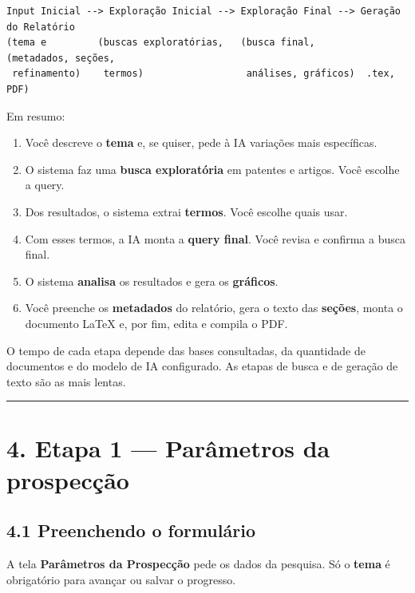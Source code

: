 \documentclass[
  brazilian,
  a4paper,12pt,oneside]{report}
\providecommand{\tightlist}{%
  \setlength{\itemsep}{0pt}\setlength{\parskip}{0pt}}
\begin{document}
\begin{verbatim}
Input Inicial --> Exploração Inicial --> Exploração Final --> Geração do Relatório
(tema e         (buscas exploratórias,   (busca final,        (metadados, seções,
 refinamento)    termos)                  análises, gráficos)  .tex, PDF)
\end{verbatim}

Em resumo:

\begin{enumerate}
\def\labelenumi{\arabic{enumi}.}
\tightlist
\item
  Você descreve o \textbf{tema} e, se quiser, pede à IA variações mais
  específicas.
\item
  O sistema faz uma \textbf{busca exploratória} em patentes e artigos.
  Você escolhe a query.
\item
  Dos resultados, o sistema extrai \textbf{termos}. Você escolhe quais
  usar.
\item
  Com esses termos, a IA monta a \textbf{query final}. Você revisa e
  confirma a busca final.
\item
  O sistema \textbf{analisa} os resultados e gera os \textbf{gráficos}.
\item
  Você preenche os \textbf{metadados} do relatório, gera o texto das
  \textbf{seções}, monta o documento LaTeX e, por fim, edita e compila o
  PDF.
\end{enumerate}

O tempo de cada etapa depende das bases consultadas, da quantidade de
documentos e do modelo de IA configurado. As etapas de busca e de
geração de texto são as mais lentas.

\begin{center}\rule{0.5\linewidth}{0.5pt}\end{center}

\chapter{4. Etapa 1 --- Parâmetros da
prospecção}\label{etapa-1-paruxe2metros-da-prospecuxe7uxe3o}

\section{4.1 Preenchendo o
formulário}\label{preenchendo-o-formuluxe1rio}

A tela \textbf{Parâmetros da Prospecção} pede os dados da pesquisa. Só o
\textbf{tema} é obrigatório para avançar ou salvar o progresso.
\end{document}
